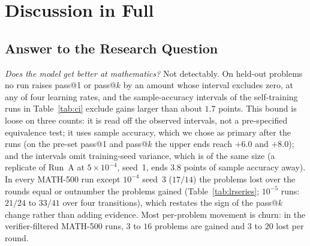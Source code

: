\documentclass[runningheads]{llncs}
\begin{document}
\section{Discussion in Full}
\label{app:discussion}

\subsection{Answer to the Research Question}
\emph{Does the model get better at mathematics?} Not detectably. On held-out
problems no run raises pass@1 or pass@$k$ by an amount whose interval excludes
zero, at any of four learning rates, and the sample-accuracy intervals of the
self-training runs in Table~\ref{tab:ci} exclude gains larger than about $1.7$ points. This bound is loose on three counts: it
is read off the observed intervals, not a pre-specified equivalence test; it
uses sample accuracy, which we chose as primary after the runs (on the pre-set
pass@1 and pass@$k$ the upper ends reach $+6.0$ and $+8.0$); and the intervals
omit training-seed variance, which is of the same size (a replicate of Run~A at
$5\times10^{-4}$, seed~1, ends $3.8$ points of sample accuracy away). In every MATH-500 run except
$10^{-4}$ seed~3 ($17/14$) the problems lost over the rounds equal or outnumber
the problems gained (Table~\ref{tab:lrseries}; $10^{-5}$ runs: $21/24$ to $33/41$
over four transitions), which restates the sign of the pass@$k$ change rather
than adding evidence. Most per-problem movement is churn: in the verifier-filtered MATH-500 runs, $3$ to $16$ problems are gained and $3$ to $20$ lost per round.
\end{document}
